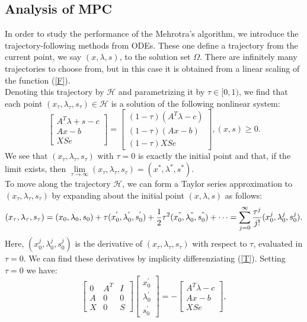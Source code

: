\documentclass[a4paper,10 pt,titlepage,twoside]{book}
\theoremstyle{plain}
\theoremstyle{definition}
\theoremstyle{remark}
\begin{document}
\subsection*{Analysis of MPC}
In order to study the performance of the Mehrotra's algorithm, we introduce the trajectory-following methods from ODEs. These one define a trajectory from the current point, we say $(x,\lambda,s)$, to the solution set $\Omega$. There are infinitely many trajectories to choose from, but in this case it is obtained from a linear scaling of the function (\ref{F}).\\ Denoting this trajectory by $\mathcal{H}$ and parametrizing it by $\tau\in[0,1)$, we find that each point $(x_{\tau},\lambda_{\tau},s_{\tau})\in\mathcal{H}$ is a solution of the following nonlinear system:
\begin{equation}\label{T}
\begin{bmatrix}
A^{T}\lambda+s-c \\Ax-b \\XSe
\end{bmatrix}=\begin{bmatrix}
(1-\tau)(A^{T}\lambda-c)\\(1-\tau)(Ax-b)\\(1-\tau)XSe
\end{bmatrix}, (x,s)\geq0.
\end{equation}
We see that $(x_{\tau},\lambda_{\tau},s_{\tau})$ with $\tau = 0$ is exactly the initial point and that, if the limit exists, then $\lim\limits_{\tau\to\infty}(x_{\tau},\lambda_{\tau},s_{\tau}) = (x^{*},\lambda^{*},s^{*})$.\\
To move along the trajectory $\mathcal{H}$, we can form a Taylor series approximation to $(x_{\tau},\lambda_{\tau},s_{\tau})$ by expanding about the initial point  $(x,\lambda,s)$ as follows:
\begin{equation*}
(x_{\tau},\lambda_{\tau},s_{\tau})=(x_{0},\lambda_{0},s_{0})+\tau(x_{0}^{'},\lambda_{0}^{'},s_{0}^{'})+\frac{1}{2}\tau^{2}(x_{0}^{"},\lambda_{0}^{"},s_{0}^{"})+\dots = \sum_{j=0}^{\infty}\frac{\tau^{j}}{j!}(x_{0}^{j},\lambda_{0}^{j},s_{0}^{j}).
\end{equation*}
Here, $(x_{0}^{j},\lambda_{0}^{j},s_{0}^{j})$ is the derivative of $(x_{\tau},\lambda_{\tau},s_{\tau})$ with respect to $\tau$, evaluated in $\tau = 0$. We can find these derivatives by implicity differenziating (\ref{T}). Setting $\tau=0$ we have:
\begin{equation}
\begin{bmatrix}
0&A^{T}&I \\A&0&0\\X&0&S
\end{bmatrix}\begin{bmatrix}
x_{0}^{'}\\\lambda_{0}^{'}\\s_{0}^{'}
\end{bmatrix}=-\begin{bmatrix}
A^{T}\lambda-c\\Ax-b\\XSe
\end{bmatrix},
\end{equation}
\end{document}
